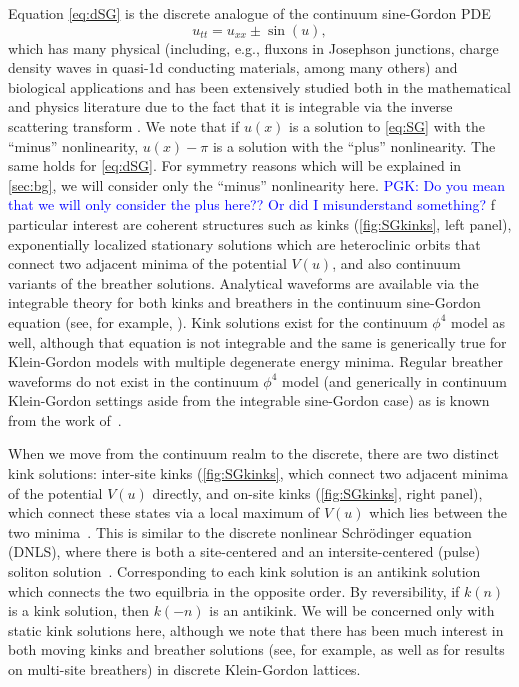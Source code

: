 \documentclass[12pt,reqno]{amsart}
\newcommand{\revisedd}[2]{ \textcolor{blue}{#1} }
\begin{document}
Equation \cref{eq:dSG} is the discrete analogue of the 
continuum sine-Gordon PDE
\begin{equation}\label{eq:SG}
	u_{tt} = u_{xx} \pm \sin(u),
\end{equation}
which has many physical (including, e.g.,
fluxons in Josephson junctions, charge density
waves in quasi-1d conducting materials, among many others)
and biological applications \cites{SGbook,Ivancevic2013} and has been extensively studied both in the mathematical and physics literature due to the fact that it is integrable via the inverse scattering transform \cite{SolitonBook1}. 
We note that if $u(x)$ is a solution to \cref{eq:SG} with the ``minus'' nonlinearity, $u(x) - \pi$ is a solution with the ``plus'' nonlinearity. The same holds for \cref{eq:dSG}. For symmetry reasons which will be explained in \cref{sec:bg}, we will consider only the ``minus'' nonlinearity here.
\revisedd{PGK: Do you mean that we will only consider the plus here?? Or did I
misunderstand something?}
Of particular interest are coherent structures such as kinks (\cref{fig:SGkinks}, left panel), exponentially localized stationary solutions which 
are heteroclinic orbits that connect two adjacent minima of the potential $V(u)$, and also continuum variants of the breather
solutions. Analytical waveforms are available via the 
integrable theory for both kinks and breathers in the continuum sine-Gordon equation (see, for example, \cite{SGchapter}). Kink  solutions exist for the continuum $\phi^4$ model as well, although that equation is not integrable \cites{SGbook,KevrekidisWeinstein2000}
and the same is generically true for Klein-Gordon
models
with multiple degenerate energy minima.
Regular breather waveforms do not exist
in the continuum $\phi^4$ model (and generically in continuum
Klein-Gordon settings aside from the integrable
sine-Gordon case) as is known from the work of~\cite{segur}. 

When we move from the continuum realm to the discrete, there are two distinct kink solutions: inter-site kinks (\cref{fig:SGkinks}, which connect two adjacent minima of the potential $V(u)$ directly, and on-site kinks (\cref{fig:SGkinks}, right panel), which connect these states via a local maximum of $V(u)$ which lies between the two minima~\cite{peyrard}. 
This is similar to the discrete nonlinear Schr{\"o}dinger equation (DNLS), where there is both a site-centered and an intersite-centered (pulse) soliton solution~\cite{Kevrekidis2009}. Corresponding to each kink solution is an antikink solution which connects the two equilbria in the opposite order. By reversibility, if $k(n)$ is a kink solution, then $k(-n)$ is an antikink. We will be concerned only with static kink solutions here, although we note that there has been much interest in both moving kinks \cites{Aigner2003,Iooss2006,Cisneros2008} and breather solutions (see, for example, \cites{SGbook} as well as \cites{Pelinovsky2012,Cuevas2011} for results on multi-site breathers) in discrete Klein-Gordon lattices.
\end{document}
